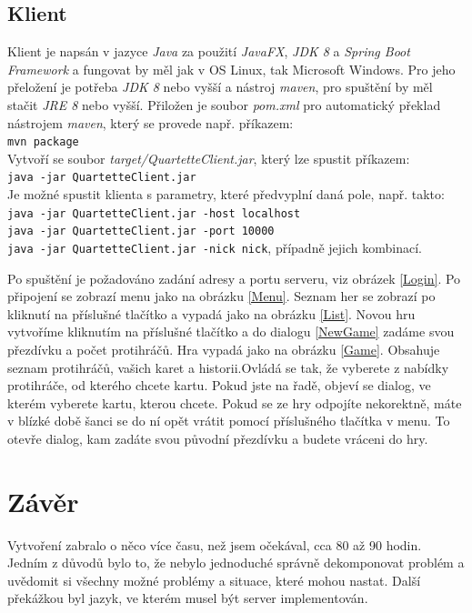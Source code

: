\documentclass[12pt, a4paper]{article}
\begin{document}
		\subsection{Klient}
		Klient je napsán v jazyce \emph{Java} za použití \emph{JavaFX}, \emph{JDK 8} a \emph{Spring Boot Framework} a fungovat by měl jak v OS Linux, tak Microsoft Windows. Pro jeho přeložení je potřeba \emph{JDK 8} nebo vyšší a nástroj \emph{maven}, pro spuštění by měl stačit \emph{JRE 8} nebo vyšší. Přiložen je soubor \emph{pom.xml} pro automatický překlad nástrojem \emph{maven}, který se provede např. příkazem:\\
		\texttt{mvn package}\\
		Vytvoří se soubor \emph{target/QuartetteClient.jar}, který lze spustit příkazem:\\
		\texttt{java -jar QuartetteClient.jar}\\
		Je možné spustit klienta s parametry, které předvyplní daná pole, např. takto:\\
		\texttt{java -jar QuartetteClient.jar -host localhost}\\
		\texttt{java -jar QuartetteClient.jar -port 10000}\\
		\texttt{java -jar QuartetteClient.jar -nick nick}, případně jejich kombinací.
		
		Po spuštění je požadováno zadání adresy a portu serveru, viz obrázek \ref{Login}. Po připojení se zobrazí menu jako na obrázku \ref{Menu}. Seznam her se zobrazí po kliknutí na příslušné tlačítko a vypadá jako na obrázku \ref{List}. Novou hru vytvoříme kliknutím na příslušné tlačítko a do dialogu \ref{NewGame} zadáme svou přezdívku a počet protihráčů. Hra vypadá jako na obrázku \ref{Game}. Obsahuje seznam protihráčů, vašich karet a historii.Ovládá se tak, že vyberete z nabídky protihráče, od kterého chcete kartu. Pokud jste na řadě, objeví se dialog, ve kterém vyberete kartu, kterou chcete. Pokud se ze hry odpojíte nekorektně, máte v blízké době šanci se do ní opět vrátit pomocí příslušného tlačítka v menu. To otevře dialog, kam zadáte svou původní přezdívku a budete vráceni do hry.
		
	\section{Závěr}
	Vytvoření zabralo o něco více času, než jsem očekával, cca 80 až 90 hodin. Jedním z důvodů bylo to, že nebylo jednoduché správně dekomponovat problém a uvědomit si všechny možné problémy a situace, které mohou nastat. Další překážkou byl jazyk, ve kterém musel být server implementován.
	
\end{document}

